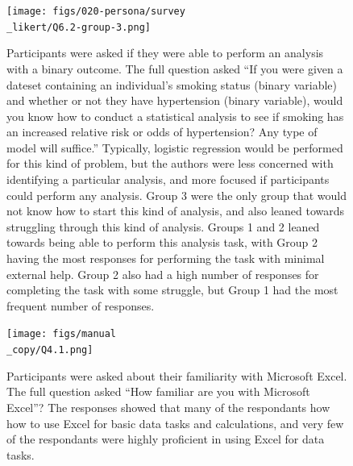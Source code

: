 \documentclass[020-persona\_validation.tex]{subfiles}
\begin{document}
    \begin{figure}[!htbp]
        \centering
        \texttt{[image: figs/020-persona/survey\\\_likert/Q6.2-group-3.png]}
        \caption[Q6.2: Statistics question result for 3 clusters]
        {Participants were asked if they were able to perform an analysis with a binary outcome.
            The full question asked
            ``If you were given a dateset containing an individual's smoking status (binary variable)
            and whether or not they have hypertension (binary variable),
            would you know how to conduct a statistical analysis
            to see if smoking has an increased relative risk or odds of hypertension? Any type of model will suffice.''
            Typically, logistic regression would be performed for this kind of problem,
            but the authors were less concerned with identifying a particular analysis,
            and more focused if participants could perform any analysis.
            Group 3 were the only group that would not know how to start this kind of analysis,
            and also leaned towards struggling through this kind of analysis.
            Groups 1 and 2 leaned towards being able to perform this analysis task,
            with Group 2 having the most responses for performing the task with minimal external help.
            Group 2 also had a high number of responses for completing the task with some struggle,
            but Group 1 had the most frequent number of responses.
        }
        \label{sfig:cluster-q6-2}
    \end{figure}

    \begin{figure}[!htbp]
        \centering
        \texttt{[image: figs/manual\\\_copy/Q4.1.png]}
        \caption[Q4.1: Excel proficiency across 3 clusters]
        {Participants were asked about their familiarity with Microsoft Excel.
            The full question asked
            ``How familiar are you with Microsoft Excel''?
            The responses showed that many of the respondants how how to use Excel for basic data tasks and calculations,
            and very few of the respondants were highly proficient in using Excel for data tasks.
        }
        \label{sfig:cluster-q4.1}
    \end{figure}
\end{document}
